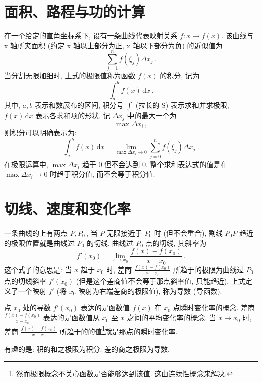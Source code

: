 \documentclass{book}
\newcommand{\dd}{\,\mathrm{d}}
\numberwithin{equation}{section}
\numberwithin{figure}{section}
\theoremstyle{definition}
\begin{document}
\section{面积、路程与功的计算}
在一个给定的直角坐标系下, 设有一条曲线代表映射关系 $f:x\mapsto f(x)$. 该曲线与 x 轴所夹面积 (约定 x 轴以上部分为正, x 轴以下部分为负) 的近似值为
\begin{equation*}
  \sum_{j=1}^{n}f(\xi_j)\Delta x_j\,.
\end{equation*}
当分割无限加细时, 上式的极限值称为函数 $f(x)$ 的积分, 记为
\begin{equation*}
  \int_a^b f(x)\dd x\,.
\end{equation*}
其中, $a,b$ 表示和数展布的区间, 积分号 $\int$ (拉长的 S) 表示求和并求极限, $f(x)\dd x$ 表示各求和项的形状. 记 $\Delta x_j$ 中的最大一个为
\begin{equation*}
  \max \Delta x_i\,,
\end{equation*}
则积分可以明确表示为:
\begin{equation*}
  \int_a^b f(x)\dd x=\lim_{\max\Delta x_i\to 0}\sum_{j=0}^{n}f(\xi_j)\Delta x_j\,.
\end{equation*}
在极限运算中, $\max\Delta x_i$ 趋于 0 但不会达到 0. 整个求和表达式的值是在 $\max\Delta x_i\to 0$ 时趋于积分值, 而不会等于积分值.

\section{切线、速度和变化率}
一条曲线的上有两点 $P,P_0$\,, 当 $P$ 无限接近于 $P_0$ 时 (但不会重合), 割线 $P_0 P$ 趋近的极限位置就是曲线过 $P_0$ 的切线. 曲线过 $P_0$ 点的切线, 其斜率为
\begin{equation*}
  f'(x_0)=\lim_{x\to x_0}\frac{f(x)-f(x_0)}{x-x_0}\,.
\end{equation*}
这个式子的意思是: 当 $x$ 趋于 $x_0$ 时, 差商 $\frac{f(x)-f(x_0)}{x-x_0}$ 所趋于的极限为曲线过 $P_0$ 点的切线斜率 $f'(x_0)$ (但是这个差商值不会等于那点斜率值, 只能趋近). 上式定义了一个映射 $f'$ (将 $x_0$ 映射为右端差商的极限值), 称为导数 (导函数).

点 $x_0$ 处的导数 $f'(x_0)$ 表达的是函数值 $f(x)$ 在 $x_0$ 点瞬时变化率的概念. 差商 $\frac{f(x)-f(x_0)}{x-x_0}$ 表达的是函数值从 $x_0$ 至 $x$ 之间的平均变化率的概念. 当 $x\to x_0$ 时, 差商 $\frac{f(x)-f(x_0)}{x-x_0}$ 所趋于的的值\footnote{然而极限概念不关心函数是否能够达到该值. 这由连续性概念来解决.}就是那点的瞬时变化率.

有趣的是: 积的和之极限为积分. 差的商之极限为导数.
\end{document}

